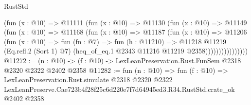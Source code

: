 \begin{lexlean}{RustStd}
\begin{coremodule}
                    (fun (x : @10) =>
                    @11111
                      (fun (x : @10) =>
                      @11130
                        (fun (x : @10) =>
                        @11149
                          (fun (x : @10) =>
                          @11168
                            (fun (x : @10) =>
                            @11187
                              (fun (x : @10) =>
                              @11206
                                (fun (x : @10) =>
                                fun (fn : @7) =>
                                fun (h : @11210) =>
                                @11218
                                  @11219
                                  (Eq.refl.{2} (Sort 1) @7)
                                  (heq_of_eq.{1} @2343 @11216 @11219 @2358))))))))))))))))
@11272 := (n : @10) -> (f : @10) -> LexLeanPreservation.Rust.FunSem @2318 @2320 @2322 @2402 @2358
@11282 := fun (n : @10) =>
  fun (f : @10) =>
  LexLeanPreservation.Rust.simulate
    @2318
    @2320
    @2322
    LexLeanPreserve.Cae723b4f28f25c6d220e7f7d64945ed3.R34.RustStd.crate_ok
    @2402
    @2358
\end{coremodule}
\end{lexlean}
